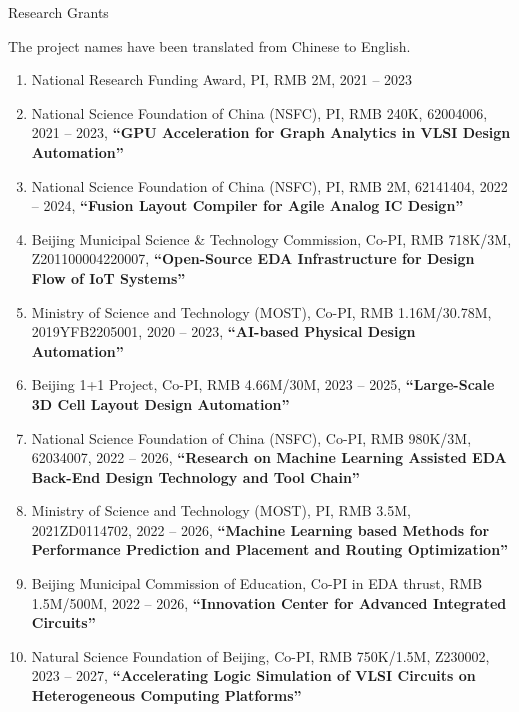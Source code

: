 \begin{rSection}{Research Grants}

  The project names have been translated from Chinese to English. 

\begin{enumerate}[font=\normalfont]

\item National Research Funding Award, PI, RMB 2M, 2021 -- 2023

\item National Science Foundation of China (NSFC), PI, RMB 240K, 62004006, 2021 -- 2023, \textbf{``GPU Acceleration for Graph Analytics in VLSI Design Automation''}

\item National Science Foundation of China (NSFC), PI, RMB 2M, 62141404, 2022 -- 2024, \textbf{``Fusion Layout Compiler for Agile Analog IC Design''}

\item Beijing Municipal Science \& Technology Commission, Co-PI, RMB 718K/3M, Z201100004220007, \textbf{``Open-Source EDA Infrastructure for Design Flow of IoT Systems''}

\item Ministry of Science and Technology (MOST), Co-PI, RMB 1.16M/30.78M, 2019YFB2205001, 2020 -- 2023, \textbf{``AI-based Physical Design Automation''}

\item Beijing 1+1 Project, Co-PI, RMB 4.66M/30M, 2023 -- 2025, \textbf{``Large-Scale 3D Cell Layout Design Automation''}

\item National Science Foundation of China (NSFC), Co-PI, RMB 980K/3M, 62034007, 2022 -- 2026, \textbf{``Research on Machine Learning Assisted EDA Back-End Design Technology and Tool Chain''}

\item Ministry of Science and Technology (MOST), PI, RMB 3.5M, 2021ZD0114702, 2022 -- 2026, \textbf{``Machine Learning based Methods for Performance Prediction and Placement and Routing Optimization''}

\item Beijing Municipal Commission of Education, Co-PI in EDA thrust, RMB 1.5M/500M, 2022 -- 2026, \textbf{``Innovation Center for Advanced Integrated Circuits''}

\item Natural Science Foundation of Beijing, Co-PI, RMB 750K/1.5M, Z230002, 2023 -- 2027, \textbf{``Accelerating Logic Simulation of VLSI Circuits on Heterogeneous Computing Platforms''}


\end{enumerate}
\end{rSection}
